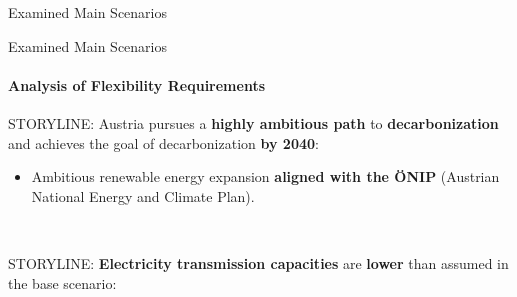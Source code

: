 \documentclass[aspectratio=169]{beamer}
\begin{document}
\begin{frame}{Examined Main Scenarios}
\end{frame}

\begin{frame}{Examined Main Scenarios}
    \framesubtitle{Analysis of Flexibility Requirements}

    \vspace{-0.8cm}
    \begin{minipage}[t][12.9cm]{\textwidth}
        \begin{minipage}[t]{0.325\textwidth}
            \begin{coloredblock}
                \begin{minipage}[t][3cm]{0.9\textwidth} 
                    \scriptsize STORYLINE: Austria pursues a \textbf{highly ambitious path} to \textbf{decarbonization} and achieves the goal of decarbonization \textbf{by 2040}:
                \end{minipage}
                \begin{minipage}[t][2.5cm]{0.9\textwidth}
                    \begin{itemize}
                        \item \scriptsize Ambitious renewable energy expansion \textbf{aligned with the ÖNIP} (Austrian National Energy and Climate Plan).
                    \end{itemize}
                \end{minipage}
                \begin{minipage}[t][3.7cm]{0.9\textwidth} 
                    \scriptsize ~
                \end{minipage}
            \end{coloredblock}
        \end{minipage}
        \hfill
        \begin{minipage}[t]{0.325\textwidth}
            \begin{coloredblock}
                \begin{minipage}[t][3cm]{0.9\textwidth} 
                    \scriptsize STORYLINE: \textbf{Electricity transmission capacities} are \textbf{lower} than assumed in the base scenario:
                \end{minipage}
                \begin{minipage}[t][2.5cm]{0.9\textwidth}
                    \begin{itemize}

\end{itemize}
\end{minipage}
\end{coloredblock}
\end{minipage}
\end{minipage}
\end{frame}
\end{document}
